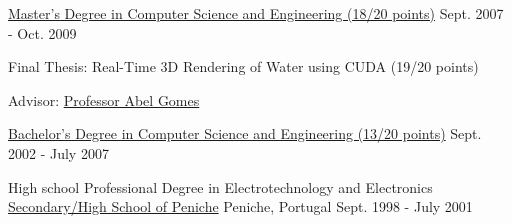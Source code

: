 \begin{cventries}
  \cventry
    {\href{https://www.ubi.pt/en/course/804}{Master's Degree in Computer Science and Engineering (18/20 points)}} %
    {} %
    {} %
    {Sept. 2007 - Oct. 2009} %
    {
      \begin{cvitems} %
        \item {Final Thesis: Real-Time 3D Rendering of Water using CUDA (19/20 points)}
        \item {Advisor: \href{http://www.di.ubi.pt/~agomes/}{Professor Abel Gomes}}
      \end{cvitems}
    }

  \cventry
    {\href{https://www.ubi.pt/en/course/42}{Bachelor's Degree in Computer Science and Engineering (13/20 points)}} %
    {} %
    {} %
    {Sept. 2002 - July 2007} %
    {
    }

  \cventry
    {High school Professional Degree in Electrotechnology and Electronics} %
    {\href{http://espeniche.pt/sitesp/index.php}{Secondary/High School of Peniche}} %
    {Peniche, Portugal} %
    {Sept. 1998 - July 2001} %
    {
    }

\end{cventries}
